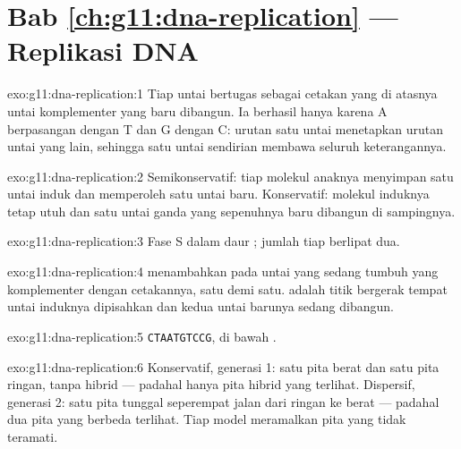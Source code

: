 \section*{Bab \ref{ch:g11:dna-replication} --- Replikasi DNA}

\begin{solution}{exo:g11:dna-replication:1}
Tiap untai bertugas sebagai cetakan yang di atasnya untai komplementer
yang baru dibangun. Ia berhasil hanya karena A berpasangan dengan T dan
G dengan C: urutan satu untai menetapkan urutan untai yang lain,
sehingga satu untai sendirian membawa seluruh keterangannya.
\end{solution}

\begin{solution}{exo:g11:dna-replication:2}
Semikonservatif: tiap molekul anaknya menyimpan satu untai induk dan
memperoleh satu untai baru. Konservatif: molekul induknya tetap utuh
dan satu untai ganda yang sepenuhnya baru dibangun di sampingnya.
\end{solution}

\begin{solution}{exo:g11:dna-replication:3}
Fase S dalam daur ; jumlah  tiap  berlipat dua.
\end{solution}

\begin{solution}{exo:g11:dna-replication:4}
 menambahkan pada untai yang sedang tumbuh 
yang komplementer dengan cetakannya, satu demi satu. 
adalah titik bergerak tempat untai induknya dipisahkan dan kedua untai
barunya sedang dibangun.
\end{solution}

\begin{solution}{exo:g11:dna-replication:5}
\texttt{CTAATGTCCG},  di bawah .
\end{solution}

\begin{solution}{exo:g11:dna-replication:6}
Konservatif, generasi 1: satu pita berat dan satu pita ringan, tanpa
hibrid --- padahal hanya pita hibrid yang terlihat. Dispersif, generasi
2: satu pita tunggal seperempat jalan dari ringan ke berat --- padahal
dua pita yang berbeda terlihat. Tiap model meramalkan pita yang tidak teramati.
\end{solution}


